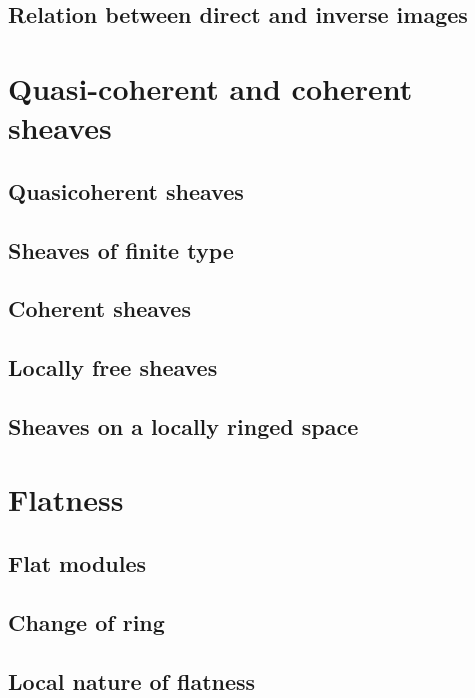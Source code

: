 \documentclass{book}
\begin{document}
\subsection{Relation between direct and inverse images}
\label{0-prelim-4.4}

\section{Quasi-coherent and coherent sheaves}
\label{0-prelim-5}

\subsection{Quasicoherent sheaves}
\label{0-prelim-5.1}

\subsection{Sheaves of finite type}
\label{0-prelim-5.2}

\subsection{Coherent sheaves}
\label{0-prelim-5.3}

\subsection{Locally free sheaves}
\label{0-prelim-5.4}

\subsection{Sheaves on a locally ringed space}
\label{0-prelim-5.5}

\section{Flatness}
\label{0-prelim-6}

\subsection{Flat modules}
\label{0-prelim-6.1}

\subsection{Change of ring}
\label{0-prelim-6.2}

\subsection{Local nature of flatness}
\label{0-prelim-6.3}
\end{document}
